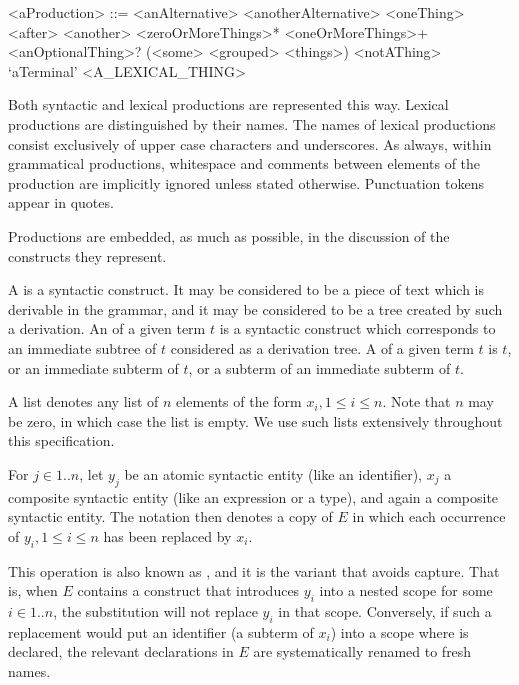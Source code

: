 \documentclass[makeidx]{article}
\begin{document}

\begin{grammar}\color{commentaryColor}
<aProduction> ::= <anAlternative>
  \alt <anotherAlternative>
  \alt <oneThing> <after> <another>
  \alt <zeroOrMoreThings>*
  \alt <oneOrMoreThings>+
  \alt <anOptionalThing>?
  \alt (<some> <grouped> <things>)
  \alt \gtilde<notAThing>
  \alt `aTerminal'
  \alt <A\_LEXICAL\_THING>
\end{grammar}

\LMHash{}%
Both syntactic and lexical productions are represented this way.
Lexical productions are distinguished by their names.
The names of lexical productions consist exclusively of
upper case characters and underscores.
As always, within grammatical productions,
whitespace and comments between elements of the production
are implicitly ignored unless stated otherwise.
Punctuation tokens appear in quotes.

\LMHash{}%
Productions are embedded, as much as possible,
in the discussion of the constructs they represent.

\LMHash{}%
A  is a syntactic construct.
It may be considered to be a piece of text which is derivable in the grammar,
and it may be considered to be a tree created by such a derivation.
An  of a given term $t$ is a syntactic construct
which corresponds to an immediate subtree of $t$
considered as a derivation tree.
A  of a given term $t$ is $t$,
or an immediate subterm of $t$,
or a subterm of an immediate subterm of $t$.

\LMHash{}%
A list  denotes any list of
$n$ elements of the form $x_i, 1 \le i \le n$.
Note that $n$ may be zero, in which case the list is empty.
We use such lists extensively throughout this specification.

%
\LMHash{}%
For $j \in 1 .. n$,
let $y_j$ be an atomic syntactic entity (like an identifier),
$x_j$ a composite syntactic entity (like an expression or a type),
and  again a composite syntactic entity.
The notation
then denotes a copy of $E$
in which each occurrence of $y_i, 1 \le i \le n$ has been replaced by $x_i$.

\LMHash{}%
This operation is also known as ,
and it is the variant that avoids capture.
That is, when $E$ contains a construct that introduces $y_i$ into
a nested scope for some $i \in 1 .. n$,
the substitution will not replace $y_i$ in that scope.
Conversely, if such a replacement would put an identifier \id{}
(a subterm of $x_i$) into a scope where \id{} is declared,
the relevant declarations in $E$ are systematically renamed to fresh names.
\end{document}
